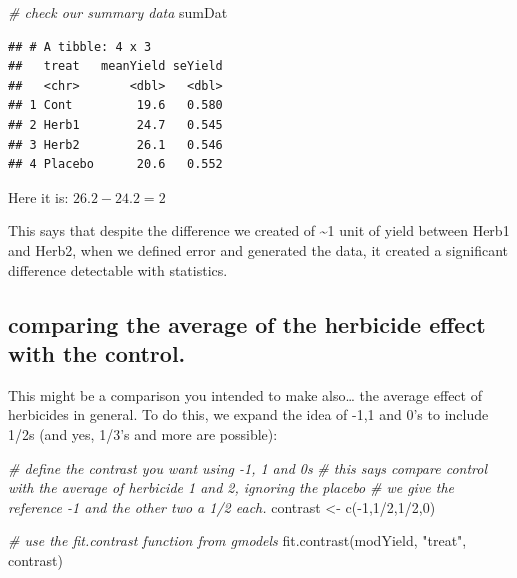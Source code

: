 \documentclass[
]{book}
\newenvironment{Shaded}{\begin{snugshade}}{\end{snugshade}}
\newcommand{\CommentTok}[1]{\textcolor[rgb]{0.56,0.35,0.01}{\textit{#1}}}
\newcommand{\DecValTok}[1]{\textcolor[rgb]{0.00,0.00,0.81}{#1}}
\newcommand{\FunctionTok}[1]{\textcolor[rgb]{0.00,0.00,0.00}{#1}}
\newcommand{\NormalTok}[1]{#1}
\newcommand{\OtherTok}[1]{\textcolor[rgb]{0.56,0.35,0.01}{#1}}
\newcommand{\SpecialCharTok}[1]{\textcolor[rgb]{0.00,0.00,0.00}{#1}}
\newcommand{\StringTok}[1]{\textcolor[rgb]{0.31,0.60,0.02}{#1}}
\begin{document}
\begin{Shaded}
\begin{Highlighting}[]
\CommentTok{\# check our summary data}
\NormalTok{sumDat}
\end{Highlighting}
\end{Shaded}

\begin{verbatim}
## # A tibble: 4 x 3
##   treat   meanYield seYield
##   <chr>       <dbl>   <dbl>
## 1 Cont         19.6   0.580
## 2 Herb1        24.7   0.545
## 3 Herb2        26.1   0.546
## 4 Placebo      20.6   0.552
\end{verbatim}

Here it is: \(26.2 - 24.2 = 2\)

This says that despite the difference we created of \textasciitilde1 unit of yield between Herb1 and Herb2, when we defined error and generated the data, it created a significant difference detectable with statistics.

\hypertarget{comparing-the-average-of-the-herbicide-effect-with-the-control.}{%
\subsection{comparing the average of the herbicide effect with the control.}\label{comparing-the-average-of-the-herbicide-effect-with-the-control.}}

This might be a comparison you intended to make also\ldots{} the average effect of herbicides in general. To do this, we expand the idea of -1,1 and 0's to include 1/2s (and yes, 1/3's and more are possible):

\begin{Shaded}
\begin{Highlighting}[]
\CommentTok{\# define the contrast you want using {-}1, 1 and 0\textquotesingle{}s}
\CommentTok{\# this says compare control with the average of herbicide 1 and 2, ignoring the placebo}
\CommentTok{\# we give the reference {-}1 and the \textquotesingle{}other two\textquotesingle{} a 1/2 each.}
\NormalTok{contrast }\OtherTok{\textless{}{-}} \FunctionTok{c}\NormalTok{(}\SpecialCharTok{{-}}\DecValTok{1}\NormalTok{,}\DecValTok{1}\SpecialCharTok{/}\DecValTok{2}\NormalTok{,}\DecValTok{1}\SpecialCharTok{/}\DecValTok{2}\NormalTok{,}\DecValTok{0}\NormalTok{)}

\CommentTok{\# use the fit.contrast function from gmodels}
\FunctionTok{fit.contrast}\NormalTok{(modYield, }\StringTok{"treat"}\NormalTok{, contrast)}
\end{Highlighting}
\end{Shaded}
\end{document}
